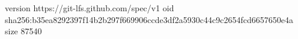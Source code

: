 version https://git-lfs.github.com/spec/v1
oid sha256:b35ea8292397f14b2b297f669906ccde3df2a5930c44c9c2654fcd6657650e4a
size 87540
